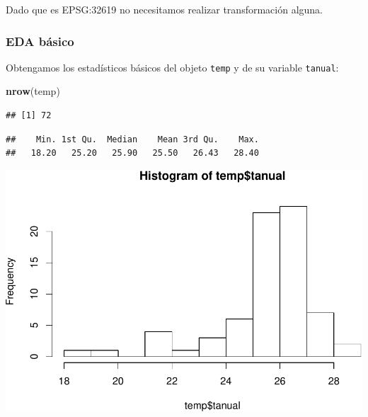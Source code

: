 \documentclass[11pt,]{article}
\newenvironment{Shaded}{\begin{snugshade}}{\end{snugshade}}
\newcommand{\KeywordTok}[1]{\textcolor[rgb]{0.13,0.29,0.53}{\textbf{#1}}}
\newcommand{\OperatorTok}[1]{\textcolor[rgb]{0.81,0.36,0.00}{\textbf{#1}}}
\newcommand{\NormalTok}[1]{#1}
\begin{document}
Dado que es EPSG:32619 no necesitamos realizar transformación alguna.

\subsubsection{EDA básico}\label{eda-buxe1sico-1}

Obtengamos los estadísticos básicos del objeto \texttt{temp} y de su
variable \texttt{tanual}:

\begin{Shaded}
\begin{Highlighting}[]
\KeywordTok{nrow}\NormalTok{(temp)}
\end{Highlighting}
\end{Shaded}

\begin{verbatim}
## [1] 72
\end{verbatim}

\begin{Shaded}
\end{Shaded}

\begin{verbatim}
##    Min. 1st Qu.  Median    Mean 3rd Qu.    Max. 
##   18.20   25.20   25.90   25.50   26.43   28.40
\end{verbatim}

\begin{Shaded}
\end{Shaded}

\includegraphics[width=600px]{Proyecto-Precipitaciones_files/figure-latex/esda-temp-1}
\end{document}
